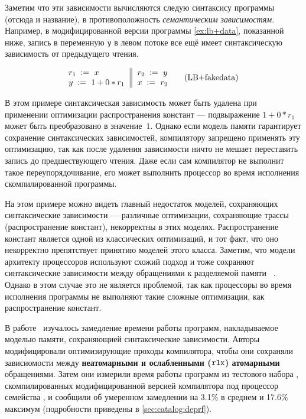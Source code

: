 Заметим что эти зависимости вычисляются следую 
синтаксису программы (отсюда и название), 
в противоположность \emph{семантическим зависимостям}. 
Например, в модифицированной версии 
программы \ref{ex:lb+data}, показанной ниже, 
запись в переменную \texttt{y} в левом потоке все ещё 
имеет синтаксическую зависимость от предыдущего чтения. 

\begin{equation*}
\inarrII{
  \readInst{}{r_1}{x}           \\
  \writeInst{}{y}{1 + 0 * r_1}  \\
}{
  \readInst{}{r_2}{y}      \\
  \writeInst{}{x}{r_2}     \\
}
\tag{LB+fakedata}\label{ex:lb+fakedata}
\end{equation*}

В этом примере синтаксическая зависимость может быть удалена
при применении оптимизации распространения констант ---
подвыражение $1 + 0 * r_1$ может быть преобразовано в значение~$1$.
Однако если модель памяти гарантирует сохранение синтаксических зависимостей,
компилятору запрещено применять эту оптимизацию, 
так как после удаления зависимости ничто не мешает 
переставить запись до предшествующего чтения. 
Даже если сам компилятор не выполнит такое переупорядочивание, 
его может выполнить процессор во время исполнения 
скомпилированной программы. 

На этом примере можно видеть главный недостаток моделей, 
сохраняющих синтаксические зависимости --- 
различные оптимизации, сохраняющие трассы
(\eg распространение констант), некорректны в этих моделях. 
Распространение констант является одной из 
классических оптимизаций, и тот факт, 
что оно некорректно препятствует принятию 
моделей этого класса. 
Заметим, что модели архитекту процессоров 
используют схожий подход и тоже 
сохраняют синтаксические зависимости 
между обращениями к разделяемой памяти%
~\cite{Sarkar-al:PLDI11, Alglave-al:TOPLAS14, Pulte-al:POPL18}.
Однако в этом случае это не является проблемой, 
так как процессоры во время исполнения программы 
не выполняют такие сложные оптимизации, 
как распространение констант.

В работе~\cite{Ou-Demsky:OOPSLA18} изучалось 
замедление времени работы программ, накладываемое моделью памяти, 
сохраняющией синтаксические зависимости. 
Авторы модифицировали оптимизирующие проходы компилятора, 
чтобы они сохраняли зависиомости между 
\textbf{неатомарными и ослабленными ($\mathtt{rlx}$) атомарными} обращениями. 
Затем они измерили время работы программ из тестового набора \SPECCPU,
скомпилированных модифицированной версией компилятора \LLVM 
под процессор семейства , и сообщили 
об умеренном замедлении на 3.1\% в среднем и 17.6\% максимум
(подробности приведены в \ref{sec:catalog:deprf}). 

